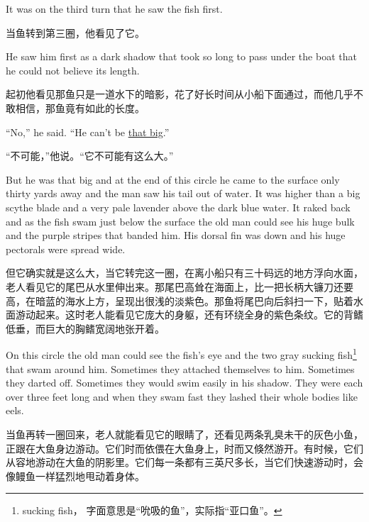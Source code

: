 \begin{paracol}{2}
It was on the third turn that he saw the fish first.

\switchcolumn

当鱼转到第三圈，他看见了它。

\switchcolumn*

He saw him first as a dark shadow that took so long to pass under the boat
that he could not believe its length.

\switchcolumn

起初他看见那鱼只是一道水下的暗影，花了好长时间从小船下面通过，而他几乎不敢相信，那鱼竟有如此的长度。

\switchcolumn*

``No,'' he said. ``He can't be \uline{that big}.''

\switchcolumn

“不可能，”他说。“它不可能有这么大。”

\switchcolumn*

But he was that big and at the end of this circle he came to the surface
only thirty yards away and the man saw his tail out of water. It was higher
than a big scythe blade and a very \gls{pale} lavender above the dark blue
water. It \gls{raked} back and as the fish swam just below the surface the
old man could see his huge \gls{bulk} and the purple stripes that
\gls{banded} him. His \gls{dorsal} fin was down and his huge pectorals
were spread wide.

\switchcolumn

但它确实就是这么大，当它转完这一圈，在离小船只有三十码远的地方浮向水面，老人看见它的尾巴从水里伸出来。那尾巴高耸在海面上，比一把长柄大镰刀还要高，在暗蓝的海水上方，呈现出很浅的淡紫色。那鱼将尾巴向后斜扫一下，贴着水面游动起来。这时老人能看见它庞大的身躯，还有环绕全身的紫色条纹。它的背鳍低垂，而巨大的胸鳍宽阔地张开着。

\switchcolumn*

On this circle the old man could see the fish's eye and the two gray sucking
fish\footnote{sucking fish， 字面意思是“吮吸的鱼”，实际指“亚口鱼”。}
that swam around him. Sometimes they \gls{attached} themselves to him.
Sometimes they \gls{darted} off. Sometimes they would swim easily in his
shadow. They were each over three feet long and when they swam fast they
\gls{lashed} their whole bodies like \glspl{eel}.

\switchcolumn

当鱼再转一圈回来，老人就能看见它的眼睛了，还看见两条乳臭未干的灰色小鱼，正跟在大鱼身边游动。它们时而依偎在大鱼身上，时而又倏然游开。有时候，它们从容地游动在大鱼的阴影里。它们每一条都有三英尺多长，当它们快速游动时，会像鳗鱼一样猛烈地甩动着身体。


\end{paracol}
